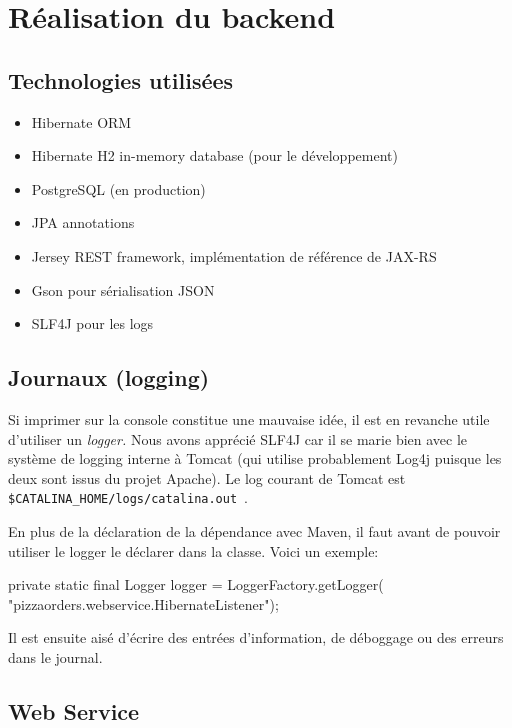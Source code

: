 
\section{Réalisation du backend}

\subsection{Technologies utilisées}

\begin{itemize}
    \item Hibernate ORM
    \item Hibernate H2 in-memory database (pour le développement)
    \item PostgreSQL (en production)
    \item JPA annotations
    \item Jersey REST framework, implémentation de référence de JAX-RS
    \item Gson pour sérialisation JSON
    \item SLF4J pour les logs
\end{itemize}

\subsection{Journaux (logging)}

Si imprimer sur la console constitue une mauvaise idée, il est en revanche utile
d'utiliser un \emph{logger.} Nous avons apprécié SLF4J car il se marie bien
avec le système de logging interne à Tomcat (qui utilise probablement Log4j 
puisque les deux sont issus du projet Apache). Le log courant de Tomcat
est \verb|$CATALINA_HOME/logs/catalina.out|~.

En plus de la déclaration de la dépendance avec Maven, il faut avant de pouvoir
utiliser le logger le déclarer dans la classe. Voici un exemple:

\begin{javacode}
private static final Logger logger = LoggerFactory.getLogger(
                     "pizzaorders.webservice.HibernateListener");
\end{javacode}

Il est ensuite aisé d'écrire des entrées d'information, de déboggage ou des erreurs dans le journal.

\subsection{Web Service}

